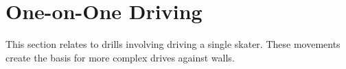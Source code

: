 \section*{One-on-One Driving}

This section relates to drills involving driving a single skater.
These movements create the basis for more complex drives against walls.
